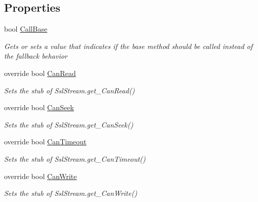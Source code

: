 \subsection*{Properties}
\begin{DoxyCompactItemize}
\item 
bool \hyperlink{class_system_1_1_net_1_1_security_1_1_fakes_1_1_stub_ssl_stream_a9f5e36654fcaf64ad0a851d18d1900a8}{Call\-Base}
\begin{DoxyCompactList}\small\item\em Gets or sets a value that indicates if the base method should be called instead of the fallback behavior\end{DoxyCompactList}\item 
override bool \hyperlink{class_system_1_1_net_1_1_security_1_1_fakes_1_1_stub_ssl_stream_ac5a8490156fb423045cf99e65d364f28}{Can\-Read}
\begin{DoxyCompactList}\small\item\em Sets the stub of Ssl\-Stream.\-get\-\_\-\-Can\-Read()\end{DoxyCompactList}\item 
override bool \hyperlink{class_system_1_1_net_1_1_security_1_1_fakes_1_1_stub_ssl_stream_ad9f694a1a0549b1dd50deeab1f64a329}{Can\-Seek}
\begin{DoxyCompactList}\small\item\em Sets the stub of Ssl\-Stream.\-get\-\_\-\-Can\-Seek()\end{DoxyCompactList}\item 
override bool \hyperlink{class_system_1_1_net_1_1_security_1_1_fakes_1_1_stub_ssl_stream_aeabbb8bc8c1863baa495a4675f9cdec2}{Can\-Timeout}
\begin{DoxyCompactList}\small\item\em Sets the stub of Ssl\-Stream.\-get\-\_\-\-Can\-Timeout()\end{DoxyCompactList}\item 
override bool \hyperlink{class_system_1_1_net_1_1_security_1_1_fakes_1_1_stub_ssl_stream_a3a860df5fb05ce4426bc0157fe860af7}{Can\-Write}
\begin{DoxyCompactList}\small\item\em Sets the stub of Ssl\-Stream.\-get\-\_\-\-Can\-Write()\end{DoxyCompactList}\item 

\end{DoxyCompactItemize}
